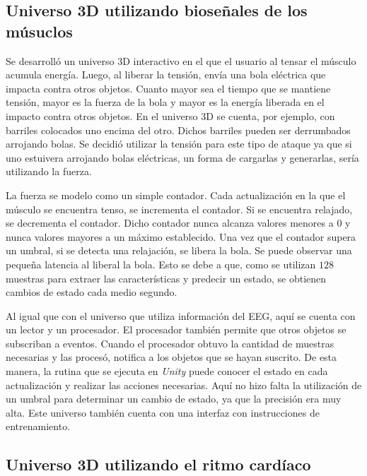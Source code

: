 \subsection{Universo 3D utilizando bioseñales de los músuclos}

Se desarrolló un universo 3D interactivo en el que el usuario al tensar el músculo acumula energía. Luego, al liberar la tensión, envía una bola eléctrica que impacta contra otros objetos. Cuanto mayor sea el tiempo que se mantiene tensión, mayor es la fuerza de la bola y mayor es la energía liberada en el impacto contra otros objetos. En el universo 3D se cuenta, por ejemplo, con barriles colocados uno encima del otro. Dichos barriles pueden ser derrumbados arrojando bolas. Se decidió utilizar la tensión para este tipo de ataque ya que si uno estuivera arrojando bolas eléctricas, un forma de cargarlas y generarlas, sería utilizando la fuerza. 

La fuerza se modelo como un simple contador. Cada actualización en la que el músculo se encuentra tenso, se incrementa el contador. Si se encuentra relajado, se decrementa el contador. Dicho contador nunca alcanza valores menores a $0$ y nunca valores mayores a un máximo establecido. Una vez que el contador supera un umbral, si se detecta una relajación, se libera la bola. Se puede observar una pequeña latencia al liberal la bola. Esto se debe a que, como se utilizan $128$ muestras para extraer las características y predecir un estado, se obtienen cambios de estado cada medio segundo.

Al igual que con el universo que utiliza información del EEG, aquí se cuenta con un lector y un procesador. El procesador también permite que otros objetos se subscriban a eventos. Cuando el procesador obtuvo la cantidad de muestras necesarias y las procesó, notifica a los objetos que se hayan suscrito. De esta manera, la rutina que se ejecuta en \emph{Unity} puede conocer el estado en cada actualización y realizar las acciones necesarias. Aquí no hizo falta la utilización de un umbral para determinar un cambio de estado, ya que la precisión era muy alta. Este universo también cuenta con una interfaz con instrucciones de entrenamiento.

\subsection{Universo 3D utilizando el ritmo cardíaco}

